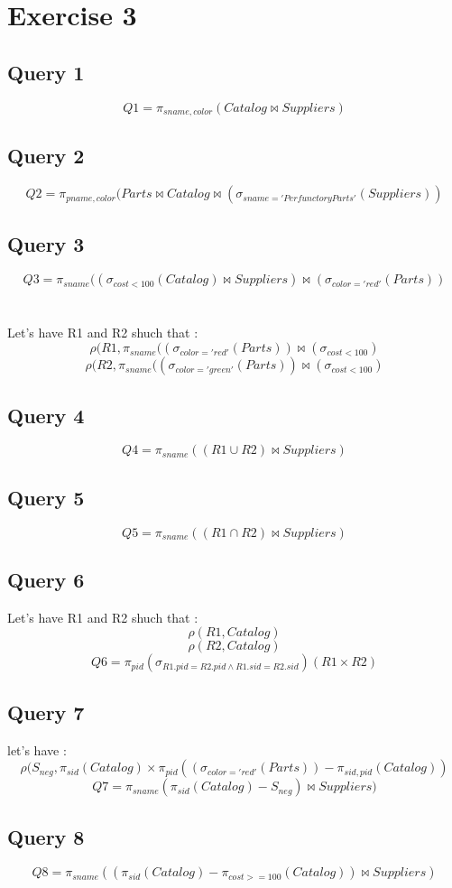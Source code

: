 \documentclass[11pt]{article}
\begin{document}
	\section*{Exercise 3}
		\subsection*{Query 1}
			$$Q1 = \pi_{sname, color}(Catalog \bowtie  Suppliers) $$
			
		\subsection*{Query 2}
			$$Q2 = \pi_{pname, color}(Parts \bowtie  Catalog \bowtie  ( \sigma_{sname='Perfunctory Parts'}(Suppliers)) $$
		\subsection*{Query 3}
			$$Q3 = \pi_{sname}((\sigma_{cost < 100} (Catalog) \bowtie Suppliers) \bowtie (\sigma_{color='red'}(Parts)) $$\\
			\\Let's have R1 and R2 shuch that :
			$$\rho(R1,\pi_{sname}((\sigma_{color='red'}(Parts)) \bowtie  (\sigma_{cost < 100})$$
$$\rho(R2,\pi_{sname}((\sigma_{color='green'}(Parts)) \bowtie  (\sigma_{cost < 100})$$
		\subsection*{Query 4}
			$$Q4 = \pi_{sname}((R1 \cup R2) \bowtie Suppliers) $$
		\subsection*{Query 5}
			$$Q5 = \pi_{sname}((R1 \cap R2) \bowtie Suppliers) $$
		\subsection*{Query 6}
			Let's have R1 and R2 shuch that :
			$$\rho(R1,Catalog)$$
			$$\rho(R2,Catalog)$$
			$$Q6 = \pi_{pid}(\sigma_{R1.pid=R2.pid \wedge R1.sid =R2.sid})(R1 \times R2)$$

		\subsection*{Query 7}
			let's have :
			$$\rho(S_{neg},\pi_{sid}(Catalog)\times \pi_{pid}((\sigma_{color='red'}(Parts)) - \pi_{sid,pid}(Catalog))$$
			$$Q7 = \pi_{sname}(\pi_{sid}(Catalog)- S_{neg})  \bowtie Suppliers)$$
					
		\subsection*{Query 8}
			$$Q8 = \pi_{sname}((\pi_{sid}(Catalog)-\pi_{cost >= 100}(Catalog))\bowtie Suppliers)$$
	
	
\end{document}
